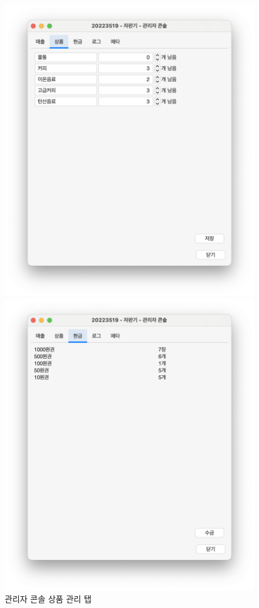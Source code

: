 \documentclass{oblivoir}
\begin{document}
    \begin{figure}
        \centering
        \begin{minipage}{.5\textwidth}
            \includegraphics[width=\textwidth]{images/snapshot/admin-inventory}
            \caption{관리자 콘솔 상품 관리 탭}
            \label{fig:admin-inventory}
        \end{minipage}%
        \begin{minipage}{.5\textwidth}
            \includegraphics[width=\textwidth]{images/snapshot/admin-cash}

\end{minipage}
\end{figure}
\end{document}
